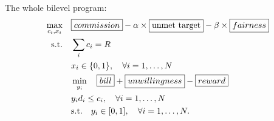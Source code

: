 \documentclass[a4paper]{article}
\begin{document}
The whole bilevel program: 
\begin{subequations}
  \begin{align}
    \max_{c_{i}, x_{i}} \quad & \boxed{commission} - \alpha \times \boxed{\text{unmet target}} - \beta \times \boxed{fairness} \\
    \mathrm{s.t.} \quad & \sum_{i} c_{i} = R \\
    & x_{i} \in \{ 0,1 \}, \quad \forall i= 1, \ldots, N \\
    & \min_{y_{i}} \quad \boxed{bill} + \boxed{unwillingness} - \boxed{reward} \\
    & y_{i} d_{i} \le c_{i}, \quad \forall i= 1, \ldots, N \\
    & \mathrm{s.t.} \quad y_{i} \in [0,1], \quad \forall i= 1, \ldots, N.
  \end{align}
\end{subequations}
\end{document}
